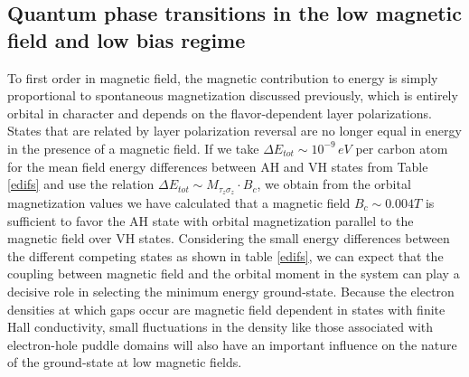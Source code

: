 \documentclass[twocolumn,prb,showpacs,preprintnumbers,amsmath,amssymb]{revtex4}
\begin{document}
\subsection{Quantum phase transitions in the low magnetic field and low bias regime}
To first order in magnetic field, the magnetic contribution to energy is simply proportional to 
spontaneous magnetization discussed previously, which is entirely orbital in character and 
depends on the flavor-dependent layer polarizations.  
States that are related by layer polarization reversal are no 
longer equal in energy in the presence of a magnetic field.   
If we take $\Delta E_{tot} \sim 10^{-9} \, eV$ per carbon atom for 
the mean field energy differences between AH and VH states from Table \ref{edifs}
and use the relation $\Delta E_{tot} \sim   M_{\tau_z \sigma_z} \cdot B_c$,
we obtain from the orbital magnetization values we have calculated 
that a magnetic field $B_c \sim 0.004 T$ is sufficient to favor the AH state with 
orbital magnetization parallel to the magnetic field
over VH states.  Considering the small energy differences between
the different competing states as shown in table \ref{edifs},
we can expect that the coupling between magnetic field and the orbital moment in the system
can play a decisive role in selecting the minimum energy ground-state.
Because the electron densities at which gaps occur are magnetic field 
dependent in states with finite Hall conductivity, 
small fluctuations in the density like those associated with electron-hole puddle domains \cite{enrico}
will also have an important influence on the nature of the ground-state at low magnetic fields.
\end{document}
